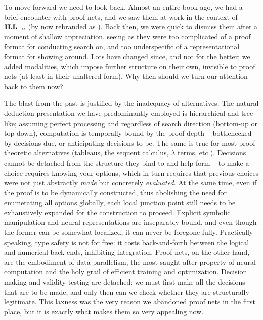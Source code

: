 To move forward we need to look back.
Almost an entire book ago, we had a brief encounter with proof nets, and we saw them at work in the context of $\ILL_{\li}$ (by now rebranded as \NLP).
Back then, we were quick to dismiss them after a moment of shallow appreciation, seeing as they were too complicated of a proof format for conducting search on, and too underspecific of a representational format for showing around.
Lots have changed since, and not for the better; we added modalities, which impose further structure on their own, invisible to proof nets (at least in their unaltered form).
Why then should we turn our attention back to them now?

The blast from the past is justified by the inadequacy of alternatives.
The natural deduction presentation we have predominantly employed is hierarchical and tree-like; assuming perfect processing and regardless of search direction (bottom-up or top-down), computation is temporally bound by the proof depth -- bottlenecked by decisions due, or anticipating decisions to be.
The same is true for most proof-theoretic alternatives (tableaus, the sequent calculus, $\lambda$ terms, etc.).
Decisions cannot be detached from the structure they bind to and help form -- to make a choice requires knowing your options, which in turn requires that previous choices were not just abstractly \textit{made} but concretely \textit{evaluated}.
At the same time, even if the proof is to be dynamically constructed, thus abolishing the need for enumerating all options globally, each local junction point still needs to be exhaustively expanded for the construction to proceed.
Explicit symbolic manipulation and neural representations are inseparably bound, and even though the former can be somewhat localized, it can never be foregone fully.
Practically speaking, type safety is not for free: it costs back-and-forth between the logical and numerical back ends, inhibiting integration.
Proof nets, on the other hand, are the embodiment of data parallelism, the most saught after property of neural computation and the holy grail of efficient training and optimization.
Decision making and validity testing are detached: we must first make all the decisions that are to be made, and only then can we check whether they are structurally legitimate.
This laxness was the very reason we abandoned proof nets in the first place, but it is exactly what makes them so very appealing now.

